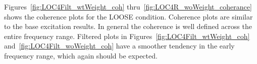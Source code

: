 \documentclass[paper=a4, fontsize=12pt]{scrartcl} %
\begin{document}
%
Figures~\ref{fig:LOC4Filt_wtWeight_coh} thru~\ref{fig:LOC4R_woWeight_coherance} shows the coherence plots for the LOOSE condition. Coherence plots are similar to the base excitation results. In general the coherence is well defined across the entire frequency range. Filtered plots in Figures~\ref{fig:LOC4Filt_wtWeight_coh} and~\ref{fig:LOC4Filt_woWeight_coh} have a smoother tendency in the early frequency range, which again should be expected.
%
	\begin{figure}[H]
		\centering
		\quad
\end{figure}
\end{document}
